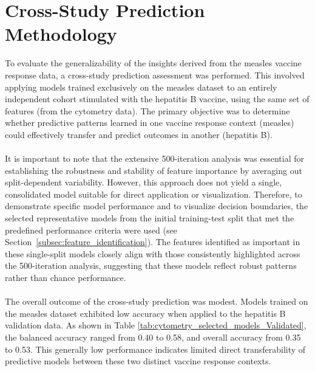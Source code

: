\documentclass[12pt,a4paper]{report}
\begin{document}
\section{Cross-Study Prediction Methodology}
\noindent
To evaluate the generalizability of the insights derived from the measles vaccine response data, a cross-study prediction assessment was performed. This involved applying models trained exclusively on the measles dataset to an entirely independent cohort stimulated with the hepatitis B vaccine, using the same set of features (from the cytometry data). The primary objective was to determine whether predictive patterns learned in one vaccine response context (measles) could effectively transfer and predict outcomes in another (hepatitis B).\\
\\
It is important to note that the extensive 500-iteration analysis was essential for establishing the robustness and stability of feature importance by averaging out split-dependent variability. However, this approach does not yield a single, consolidated model suitable for direct application or visualization. Therefore, to demonstrate specific model performance and to visualize decision boundaries, the selected representative models from the initial training-test split that met the predefined performance criteria were used (see Section~\ref{subsec:feature_identification}). The features identified as important in these single-split models closely align with those consistently highlighted across the 500-iteration analysis, suggesting that these models reflect robust patterns rather than chance performance.\\
\\
The overall outcome of the cross-study prediction was modest. Models trained on the measles dataset exhibited low accuracy when applied to the hepatitis B validation data. As shown in Table \ref{tab:cytometry_selected_models_Validated}, the balanced accuracy ranged from 0.40 to 0.58, and overall accuracy from 0.35 to 0.53. This generally low performance indicates limited direct transferability of predictive models between these two distinct vaccine response contexts.\\
\end{document}
